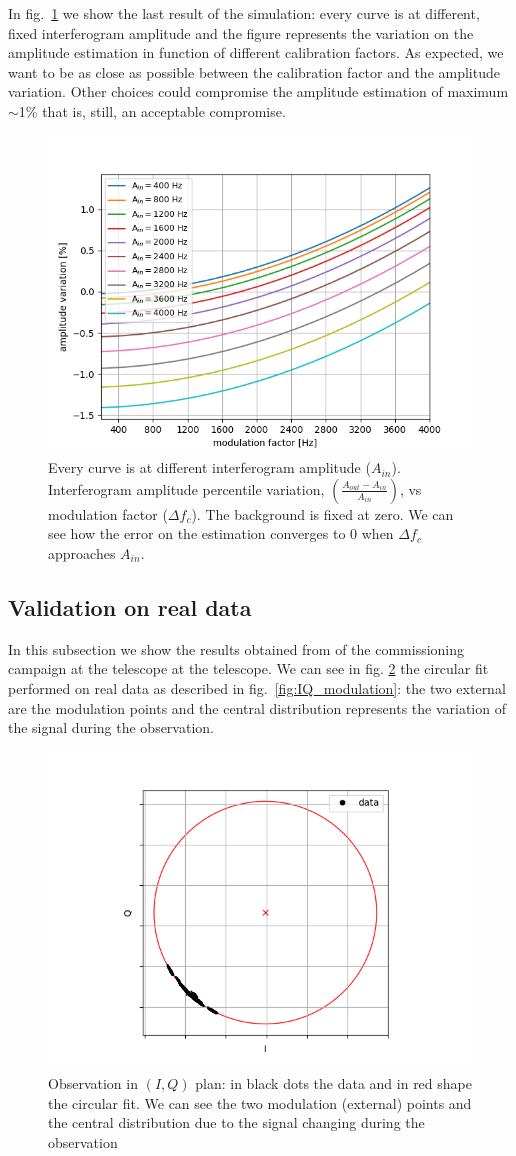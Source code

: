 \documentclass[twocolumn,traditabstract]{aa}\\
\begin{document}
\noindent In fig.~\ref{fig:amp_mod} we show the last result of the simulation: every curve is at different, fixed interferogram amplitude and the figure represents the variation on the amplitude estimation in function of different calibration factors. As expected, we want to be as close as possible between the calibration factor and the amplitude variation. Other choices could compromise the amplitude estimation of maximum $\sim$1\% that is, still, an acceptable compromise.

\begin{figure}[htf]
	\centering
 	\includegraphics[width=.5\textwidth]{3.acqui/several_modulations.png}
	\caption{Every curve is at different interferogram amplitude ($A_{in}$). Interferogram amplitude percentile variation, $\left( \frac{A_{out}-A_{in}}{A_{in}} \right)$, vs modulation factor ($\Delta f_c$).  The background is fixed at zero. We can see how the error on the estimation converges to 0 when $\Delta f_c$ approaches $A_{in}$. }
	\label{fig:amp_mod}
\end{figure}


\subsection{Validation on real data}
In this subsection we show the results obtained from of the commissioning campaign at the telescope at the telescope. We can see in fig. \ref{fig:circle} the circular fit performed on real data as described in fig.~\ref{fig:IQ_modulation}: the two external are the modulation points and the central distribution represents the variation of the signal during the observation.


\begin{figure}[htf]
	\centering
	\includegraphics[width=.5\textwidth]{4.results/circular_fit.png}
	\caption{Observation in $(I,Q)$ plan: in black dots the data and in red shape the circular fit. We can see the two modulation (external) points and the central distribution due to the signal changing during the observation}
	\label{fig:circle}
\end{figure}
\end{document}
